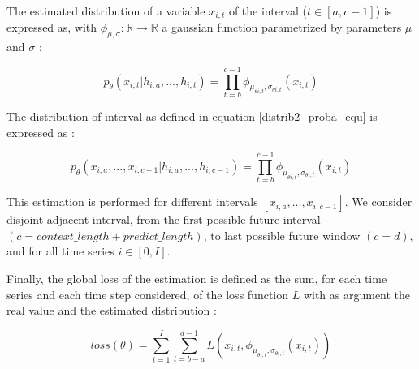The estimated distribution of a variable $x_{i,t}$ of the interval ($t \in [a,c-1]$) is expressed as, with $\phi_{\mu,\sigma}: \mathbb{R} \to \mathbb{R} $ a gaussian function parametrized by parameters $\mu$ and $\sigma$ :

\begin{equation}
    p_{\theta}(x_{i,t} | h_{i,a}, ..., h_{i,t}) = \prod_{t=b}^{c-1} \phi_{\mu_{\theta i,t},\sigma_{\theta i,t}}(x_{i,t})
\end{equation}

The distribution of interval as defined in equation \ref{distrib2_proba_equ} is expressed as  :

\begin{equation}
     p_{\theta}(x_{i,a}, ..., x_{i,c-1} | h_{i,a}, ..., h_{i,c-1})  = \prod_{t=b}^{c-1} \phi_{\mu_{\theta i,t},\sigma_{\theta i,t}}(x_{i,t})
\end{equation}

This estimation is performed for different intervals $[x_{i,a},...,x_{i,c-1}]$. We consider disjoint adjacent interval, from the first possible future interval $(c = context\_length + predict\_length)$, to last possible future window $(c=d)$, and for all time series $i \in [0,I]$.


Finally, the global loss of the estimation is defined as the sum, for each time series and each time step considered, of the loss function $L$ with as argument the real value and the estimated distribution :

\begin{equation}
    loss(\theta) = \sum^{I}_{i=1}\sum^{d-1}_{t=b-a}L(x_{i,t},\phi_{\mu_{\theta i,t},\sigma_{\theta i,t}}(x_{i,t}))
\end{equation}









